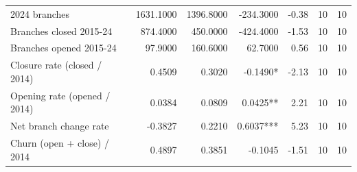 \begin{tabular}{lrrrrrr}
2024 branches & 1631.1000 & 1396.8000 & -234.3000 & -0.38 & 10 & 10 \\
Branches closed 2015-24 & 874.4000 & 450.0000 & -424.4000 & -1.53 & 10 & 10 \\
Branches opened 2015-24 & 97.9000 & 160.6000 & 62.7000 & 0.56 & 10 & 10 \\
Closure rate (closed / 2014) & 0.4509 & 0.3020 & -0.1490* & -2.13 & 10 & 10 \\
Opening rate (opened / 2014) & 0.0384 & 0.0809 & 0.0425** & 2.21 & 10 & 10 \\
Net branch change rate & -0.3827 & 0.2210 & 0.6037*** & 5.23 & 10 & 10 \\
Churn (open + close) / 2014 & 0.4897 & 0.3851 & -0.1045 & -1.51 & 10 & 10 \\
\bottomrule
\end{tabular}

